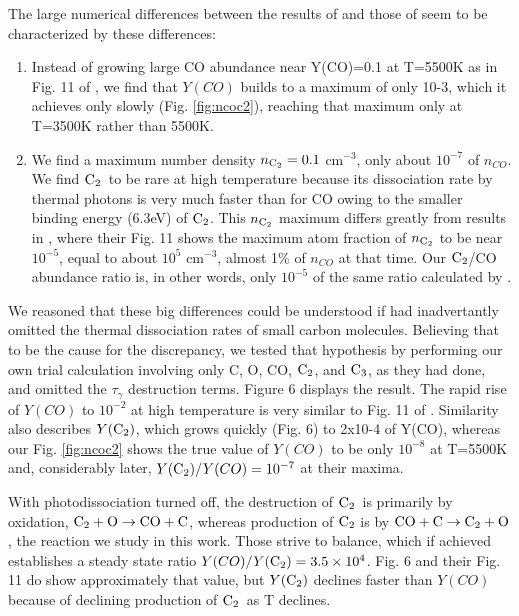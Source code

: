\documentclass[manuscript]{aastex}
\newcommand{\ctwo}{{\rm C}_2}
\newcommand{\cthree}{{\rm C}_3}
\newcommand{\coctoctwo}{${\rm CO} + {\rm C} \to \ctwo + {\rm O}$}
\newcommand{\ctowotococ}{$\ctwo + {\rm O} \to {\rm CO} + {\rm C}$}
\begin{document}
The large numerical differences between the results of
\citet{1999Sci...283.1290C,2001ApJ...562..480C}
and those of \citet{2009ApJ...703..642C}
seem to be characterized by these differences:
\begin{enumerate}

\item Instead of growing large CO abundance near Y(CO)=0.1 at T=5500K
as in Fig. 11 of \citet{2009ApJ...703..642C}, we find that $Y(CO)$
builds to a maximum of only 10-3, which it achieves only slowly
(Fig. \ref{fig:ncoc2}), reaching that maximum only at T=3500K rather
than 5500K.

\item We find a maximum number density $n_{\ctwo} = 0.1$ cm$^{-3}$,
only about $10^{-7}$ of
$n_{CO}$. We find $\ctwo$\ to be rare at high temperature because its
dissociation rate by thermal photons is very much faster than for CO
owing to the smaller binding energy (6.3eV) of $\ctwo$. This $n_{\ctwo}$
maximum differs greatly from results in \citet{2009ApJ...703..642C},
where their Fig. 11 shows the maximum atom fraction of $n_{\ctwo}$ to be
near $10^{-5}$, equal to about $10^5$ cm$^{-3}$, almost 1\% of
$n_{CO}$ at that time. Our $\ctwo$/CO abundance ratio is,
in other words, only $10^{-5}$ of the same ratio calculated by
\citet{2009ApJ...703..642C}.

\end{enumerate}
We reasoned that these big differences could be understood if
\citet{2009ApJ...703..642C} had inadvertantly omitted the thermal
dissociation rates of small carbon molecules. Believing that to be the
cause for the discrepancy, we tested that hypothesis by performing our
own trial calculation involving only C, O, CO, $\ctwo$, and $\cthree$,
as they had done,
and omitted the $\tau_\gamma$ destruction terms.
Figure 6 displays the result.
The rapid rise of $Y(CO)$ to $10^{-2}$ at high temperature is very similar to
Fig. 11 of \citet{2009ApJ...703..642C}.
Similarity also describes $Y(\ctwo)$,
which grows quickly (Fig. 6) to 2x10-4 of Y(CO),
whereas our Fig. \ref{fig:ncoc2} shows the true value of $Y(CO)$ to be
only $10^{-8}$ at T=5500K and, considerably later,
$Y(\ctwo)/Y(CO) = 10^{-7}$ at their maxima. 

With photodissociation turned off, the destruction of $\ctwo$\ is primarily
by oxidation, \ctowotococ, whereas production of $\ctwo$ is by
\coctoctwo, the reaction we study in this work.
Those strive to balance, which if achieved establishes a steady state
ratio $Y(CO)/Y(\ctwo) = 3.5 \times 10^4$. Fig. 6 and their Fig. 11 do show
approximately that value, but $Y(\ctwo)$ declines faster than $Y(CO)$
because of declining production of $\ctwo$\ as T declines.
\end{document}
